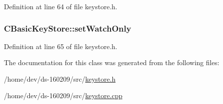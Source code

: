 Definition at line 64 of file keystore.\+h.

\hypertarget{class_c_basic_key_store_ac3391cb491e315403ad9af6afd1313da}{}
\subsubsection[{set\+Watch\+Only}]{ C\+Basic\+Key\+Store\+::set\+Watch\+Only\hspace{0.3cm}{\ttfamily [protected]}}\label{class_c_basic_key_store_ac3391cb491e315403ad9af6afd1313da}


Definition at line 65 of file keystore.\+h.



The documentation for this class was generated from the following files\+:\begin{DoxyCompactItemize}
\item 
/home/dev/ds-\/160209/src/\hyperlink{keystore_8h}{keystore.\+h}\item 
/home/dev/ds-\/160209/src/\hyperlink{keystore_8cpp}{keystore.\+cpp}\end{DoxyCompactItemize}
